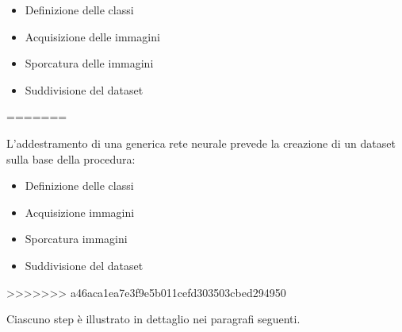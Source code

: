 \documentclass[14pt]{extarticle}
\begin{document}
\begin{itemize}
\item Definizione delle classi
\item Acquisizione delle immagini
\item Sporcatura delle immagini
\item Suddivisione del dataset
\end{itemize}
=======

L'addestramento di una generica rete neurale prevede la creazione di un dataset sulla
base della procedura:
	\begin{itemize}
	\item Definizione delle classi
	\item Acquisizione immagini
	\item Sporcatura immagini
	\item Suddivisione del dataset
	\end{itemize}
>>>>>>> a46aca1ea7e3f9e5b011cefd303503cbed294950

Ciascuno step è illustrato in dettaglio nei paragrafi seguenti.

\end{document}
